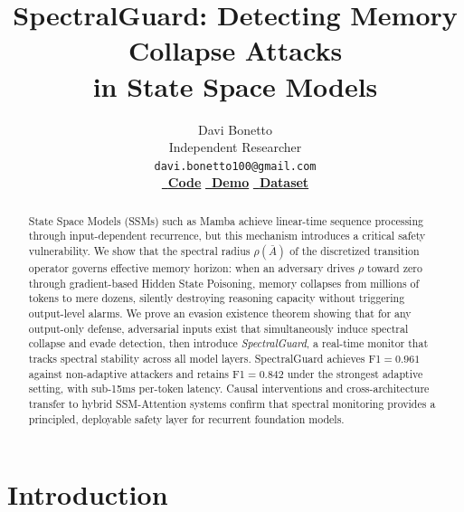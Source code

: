 \documentclass[10pt,twocolumn]{article}
\title{\vspace{-1.5cm}\textbf{\LARGE SpectralGuard: Detecting Memory Collapse Attacks \\[0.3em] in State Space Models}}
\author{
    \Large Davi Bonetto \\[0.5em]
    \large Independent Researcher \\[0.3em]
    \texttt{davi.bonetto100@gmail.com} \\[0.5em]
    \small\href{https://github.com/DaviBonetto/spectralguard}{\githubicon\ \textbf{Code}}%
    \hspace{1.2em}%
    \href{https://huggingface.co/spaces/DaviBonetto/spectralguard-demo}{\hficon\ \textbf{Demo}}%
    \hspace{1.2em}%
    \href{https://huggingface.co/datasets/DaviBonetto/spectralguard-dataset}{\hficon\ \textbf{Dataset}}
}
\date{}
\begin{document}

\maketitle

\begin{abstract}
State Space Models (SSMs) such as Mamba achieve linear-time sequence processing through input-dependent recurrence, but this mechanism introduces a critical safety vulnerability. We show that the spectral radius $\rho(\bar{A})$ of the discretized transition operator governs effective memory horizon: when an adversary drives $\rho$ toward zero through gradient-based Hidden State Poisoning, memory collapses from millions of tokens to mere dozens, silently destroying reasoning capacity without triggering output-level alarms. We prove an evasion existence theorem showing that for any output-only defense, adversarial inputs exist that simultaneously induce spectral collapse and evade detection, then introduce \emph{SpectralGuard}, a real-time monitor that tracks spectral stability across all model layers. SpectralGuard achieves F1$=0.961$ against non-adaptive attackers and retains F1$=0.842$ under the strongest adaptive setting, with sub-15ms per-token latency. Causal interventions and cross-architecture transfer to hybrid SSM-Attention systems confirm that spectral monitoring provides a principled, deployable safety layer for recurrent foundation models.
\end{abstract}


\section{Introduction}
\label{sec:intro}
\end{document}
